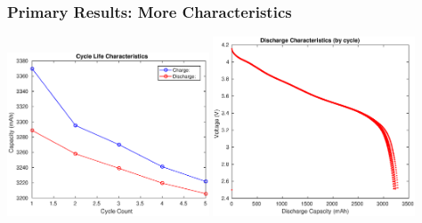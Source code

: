 \documentclass{beamer}
\begin{document}
\begin{frame}
\frametitle{Primary Results: More Characteristics}
\includegraphics[width=6cm]{CycleLifeCharacteristics-C.eps}
\includegraphics[width=6cm]{DischargeCharacteristics-C.eps}
\end{frame}

\end{document}
